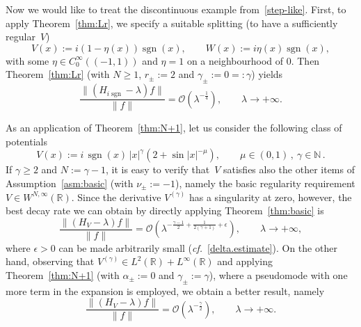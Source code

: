 \begin{Example}
\label{ex:sgn.1}
Now we would like to treat
the discontinuous example from~\eqref{step-like}.
First, to apply Theorem~\ref{thm:Lr},
we specify a suitable splitting (to have a sufficiently regular~$V$)
\begin{equation}\label{splitting}
V(x) := i (1-\eta(x)){\mathop{\mathrm{sgn}}\nolimits} (x), \qquad 
W(x) := i \eta(x) {\mathop{\mathrm{sgn}}\nolimits} (x), 
\end{equation}
with some $\eta \in C_0^\infty((-1,1))$ and $\eta = 1$ on a neighbourhood of $0$. 
Then Theorem~\ref{thm:Lr} 
(with $N \geq 1$, $r_\pm:=2$ and $\gamma_\pm:=0=:\gamma$)
yields
\begin{equation}\label{HVW.f.sgn.1}
\frac{\|(H_{i {\mathop{\mathrm{sgn}}\nolimits}}-\lambda) f\|}{\|f\|} = 
{\mathcal{O}} \left( \lambda^{-\frac 14} \right), \qquad \lambda \to + \infty.
\end{equation}
\end{Example}

\begin{Example}
As an application of Theorem~\ref{thm:N+1}, let us consider
the following class of potentials
$$
  V(x) := i \, {\mathop{\mathrm{sgn}}\nolimits} (x) \, |x|^\gamma
  \left(2+\sin |x|^{-\mu}\right)
  , \qquad 
  \mu \in (0,1) 
  \,, \ 
  \gamma \in {\mathbb{N}} 
  \,.
$$
If $\gamma \geq 2$ and $N:=\gamma-1$,
it is easy to verify that~$V$ satisfies also
the other items of Assumption~\ref{asm:basic} (with $\nu_\pm := -1$),
namely the basic regularity requirement $V \in W^{N,\infty}({\mathbb{R}})$.
Since the derivative $V^{(\gamma)}$ has a singularity at zero, however,
the best decay rate we can obtain by directly
applying Theorem~\ref{thm:basic} is 
\begin{equation} 
\frac{\|(H_{V}-\lambda) f\|}{\|f\|} = 
{\mathcal{O}}\left(
\lambda^{-\frac{\gamma-1}{2} + \frac 1{2(\gamma+1)} + \epsilon}  
\right), \qquad \lambda \to + \infty,
\end{equation}
where $\epsilon>0$ can be made arbitrarily small
({\emph{cf.}}~\eqref{delta.estimate}).
On the other hand, observing that 
$V^{(\gamma)} \in {L^2}({\mathbb{R}}) + L^\infty({\mathbb{R}})$ 
and applying Theorem~\ref{thm:N+1} 
(with $\alpha_\pm:=0$ and $\gamma_\pm:=\gamma$), 
where a pseudomode with one more term in the expansion is employed, 
we obtain a better result, namely
\begin{equation} 
\frac{\|(H_{V}-\lambda) f\|}{\|f\|} = 
{\mathcal{O}}\left(
\lambda^{-\frac{\gamma}{2}} 
\right), \qquad \lambda \to + \infty.  
\end{equation}
\end{Example} 

